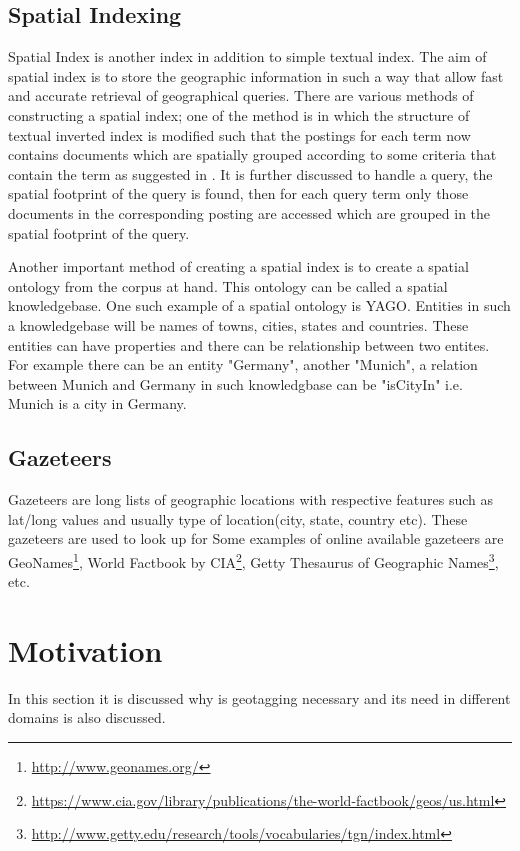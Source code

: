 \documentclass[
     11pt,         %
     a4paper,      %
     oneside,
     ]{article}
\begin{document}
\subsection{Spatial Indexing} Spatial Index is another index in addition to simple textual index. The aim of spatial index is to store the geographic information in such a way that allow fast and accurate retrieval of geographical queries. There are various methods of constructing a spatial index; one of the method is in which the structure of textual inverted index is modified such that the postings for each term now contains documents which are spatially grouped according to some criteria that contain the term as suggested in \cite{Vaid:2005:SIG:2156226.2156244}. It is further discussed to handle a query, the spatial footprint of the query is found, then for each query term only those documents in the corresponding posting are accessed which are grouped in the spatial footprint of the query. 

Another important method of creating a spatial index is to create a spatial ontology from the corpus at hand. This ontology can be called a spatial knowledgebase. One such example of a spatial ontology is YAGO. Entities in such a knowledgebase will be names of towns, cities, states and countries. These entities can have properties and there can be relationship between two entites. For example there can be an entity "Germany", another "Munich", a relation between Munich and Germany in such knowledgbase can be "isCityIn" i.e. Munich is a city in Germany.

\subsection{Gazeteers} 
Gazeteers are long lists of geographic locations with respective features such as lat/long values and usually type of location(city, state, country etc). These gazeteers are used to look up for Some examples of online available gazeteers are GeoNames\footnote{\url{http://www.geonames.org/}}, World Factbook by CIA\footnote{\url{https://www.cia.gov/library/publications/the-world-factbook/geos/us.html}}, Getty Thesaurus of Geographic Names\footnote{\url{http://www.getty.edu/research/tools/vocabularies/tgn/index.html}}, etc.

\section{Motivation}\label{sec:sections}
In this section it is discussed why is geotagging necessary and its need in different domains is also discussed.
\end{document}
